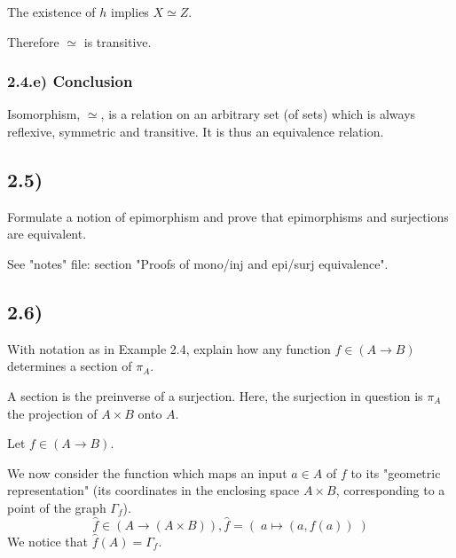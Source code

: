 \documentclass[12pt, letterpaper, twoside]{report}
\begin{document}
The existence of $h$ implies $X \simeq Z$.

Therefore $\simeq$ is transitive.


\subsubsection*{2.4.e) Conclusion}

Isomorphism, $\simeq$, is a relation on an arbitrary set (of sets) which is always reflexive, symmetric and transitive. It is thus an equivalence relation.



\subsection*{2.5)}

Formulate a notion of epimorphism and prove that epimorphisms and surjections are equivalent.

See "notes" file: section "Proofs of mono/inj and epi/surj equivalence".


\subsection*{2.6)}

With notation as in Example 2.4, explain how any function $f \in (A \to B)$ determines a section of $\pi_A$.

A section is the preinverse of a surjection. Here, the surjection in question is $\pi_A$ the projection of $A \times B$ onto $A$.

Let $f \in (A \to B)$.


We now consider the function which maps an input $a \in A$ of $f$ to its "geometric representation" (its coordinates in the enclosing space $A \times B$, corresponding to a point of the graph $\Gamma_f$). 
$$\hat{f} \in (A \to (A \times B)), \hat{f} = ( \; a \mapsto (a, f(a)) \; )$$
We notice that $\hat{f}(A) = \Gamma_f$.
\end{document}

